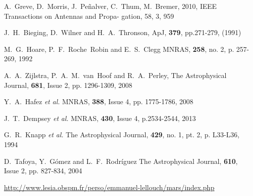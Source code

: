 \begin{thebibliography}{99}
 A.~Greve, D.~Morris, J.~Pe\~nalver, C.~Thum, M.~Bremer, 2010, IEEE Transactions on Antennas and Propa-
 gation, 58, 3, 959



  J.~H.~Bieging, D.~Wilner and  H.~A.~Thronson, ApJ, {\bf 379},
  pp.271-279, (1991)

  M.~G.~Hoare, P.~F.~Roche~Robin and E.~S.~Clegg 
 MNRAS, {\bf 258}, no. 2, p. 257-269, 1992 

  A.~A.~Zijlstra,  P.~A.~M.~van~Hoof and R.~A.~Perley,
  The Astrophysical Journal, {\bf 681}, Issue 2, pp. 1296-1309, 2008
  
  Y.~A.~Hafez {\it et al.}
  MNRAS, {\bf 388}, Issue 4, pp. 1775-1786, 2008

  J.~T.~Dempsey {\it et al.} 
  MNRAS, {\bf 430}, Issue 4, p.2534-2544, 2013

  G.~R.~Knapp {\it et al.} 
The Astrophysical Journal, {\bf 429}, no. 1, pt. 2, p. L33-L36, 1994

  D.~Tafoya, Y.~G\'omez and  L.~F.~Rodr\'iguez	
The Astrophysical Journal, {\bf 610}, Issue 2, pp. 827-834, 2004

\url{http://www.lesia.obspm.fr/perso/emmanuel-lellouch/mars/index.php}


\end{thebibliography}
